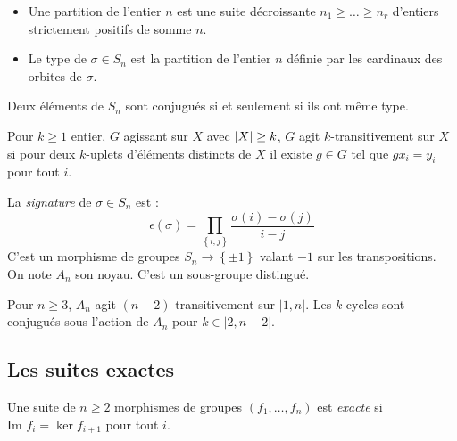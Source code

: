 \documentclass{cours}
\begin{document}
\begin{definition}
    \begin{itemize}
        \item Une partition de l'entier $n$ est une suite décroissante $n_{1} \geq \ldots \geq n_{r}$ d'entiers strictement positifs de somme $n$.
        \item Le type de $\sigma \in S_{n}$ est la partition de l'entier $n$ définie par les cardinaux des orbites de $\sigma$.
    \end{itemize}
\end{definition}

\begin{proposition}
    Deux éléments de $S_{n}$ sont conjugués si et seulement si ils ont même type.
\end{proposition}

\begin{definition}
    Pour $k\geq 1$ entier, $G$ agissant sur $X$ avec $\left|X\right| \geq k$, $G$ agit $k$-transitivement sur $X$ si pour deux $k$-uplets d'éléments distincts de $X$ il existe $g \in G$ tel que $gx_{i} = y_{i}$ pour tout $i$.
\end{definition}

\begin{definition}
    La \emph{signature} de $\sigma \in S_{n}$ est :
    \[
        \epsilon(\sigma) = \prod_{\left\{i, j\right\}} \frac{\sigma(i) - \sigma(j)}{i - j}
    \]
    C'est un morphisme de groupes $S_{n} \rightarrow \left\{\pm 1\right\}$ valant $-1$ sur les transpositions. On note $A_{n}$ son noyau. C'est un sous-groupe distingué.
\end{definition}

\begin{proposition}
    Pour $n \geq 3$, $A_{n}$ agit $\left(n - 2\right)$-transitivement sur $\lvert 1, n \rvert$. Les $k$-cycles sont conjugués sous l'action de $A_n$ pour $k \in \lvert 2, n-2 \rvert$.
\end{proposition}

\subsection{Les suites exactes}

\begin{definition}
    Une suite de $n \geq 2$ morphismes de groupes $(f_{1}, \ldots, f_{n})$ est \emph{exacte} si $\text{Im } f_{i} = \ker f_{i+1}$ pour tout $i$.
\end{definition}
\end{document}
